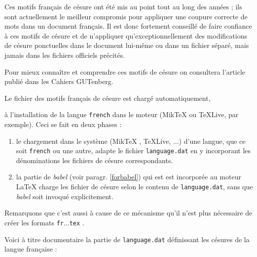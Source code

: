 \documentclass[a4paper,12pt,openright]{article}
\begin{document}
Ces motifs français de césure ont été mis au point tout au long des années ;
ils sont actuellement le meilleur compromis pour appliquer une coupure correcte
de mots dans un document français. Il est donc fortement conseillé de
faire confiance à ces motifs de césure et de n'appliquer qu’exceptionnellement
des modifications de césure ponctuelles dans le document lui-même ou dans
un fichier séparé, mais jamais dans les fichiers officiels précités.

Pour mieux connaître et comprendre ces motifs de césure on consultera
l'article \cite{cesures} publié dans les Cahiers GUTenberg.


 Le fichier des motifs français de césure est chargé automatiquement,\begin{MAJ}
à l'installation de la langue \texttt{french} dans le moteur (Mik\TeX{} ou \TeX Live, par exemple).
Ceci se fait en deux phases :
\begin{enumerate}
\item le chargement dans le système (Mik\TeX{} , \TeX Live, ...) d'une langue, que ce soit 
\texttt{french} ou une autre, adapte le fichier \texttt{language.dat} en y incorporant
les dénominations les fichiers de césure correspondants.
\item la partie de \textit{ babel} (voir paragr. \ref{forbabel}) qui est est incorporée
au moteur {\LaTeX} charge les fichier de césure selon le contenu de \texttt{language.dat},
sans que \textit{ babel} soit invoqué explicitement.
\end{enumerate}
Remarquons que c'est aussi à cause de ce mécanisme qu'il n'est plus 
nécessaire de créer les formats \texttt{fr}...\texttt{tex} .
\end{MAJ}
Voici à titre documentaire la partie de \texttt{language.dat} définissant les césures de la langue française :\\[0.5ex]
\end{document}
